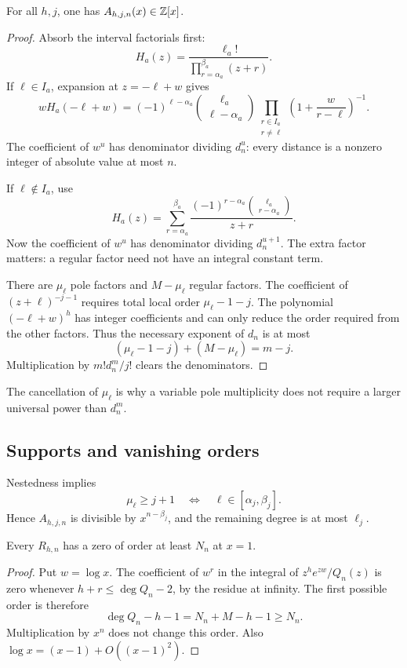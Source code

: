 \begin{lemma}[Integrality]\label{lem:integrality}
For all \(h,j\), one has \(A_{h,j,n}(x)\in\mathbb Z[x]\).
\end{lemma}
\begin{proof}
Absorb the interval factorials first:
\[
H_a(z)=\frac{\ell_a!}{\prod_{r=\alpha_a}^{\beta_a}(z+r)}.
\]
If \(\ell\in I_a\), expansion at \(z=-\ell+w\) gives
\begin{equation}\label{eq:polelocal}
wH_a(-\ell+w)=
(-1)^{\ell-\alpha_a}\binom{\ell_a}{\ell-\alpha_a}
\prod_{\substack{r\in I_a\\r\ne\ell}}
\left(1+\frac{w}{r-\ell}\right)^{-1}.
\end{equation}
The coefficient of \(w^u\) has denominator dividing \(d_n^u\):
every distance is a nonzero integer of absolute value at most \(n\).

If \(\ell\notin I_a\), use
\begin{equation}\label{eq:regularpartial}
H_a(z)=\sum_{r=\alpha_a}^{\beta_a}
\frac{(-1)^{r-\alpha_a}\binom{\ell_a}{r-\alpha_a}}{z+r}.
\end{equation}
Now the coefficient of \(w^u\) has denominator dividing \(d_n^{u+1}\).
The extra factor matters: a regular factor need not have an integral
constant term.

There are \(\mu_\ell\) pole factors and \(M-\mu_\ell\) regular factors.
The coefficient of \((z+\ell)^{-j-1}\) requires total local order
\(\mu_\ell-1-j\). The polynomial \((-\ell+w)^h\) has integer
coefficients and can only reduce the order required from the other
factors. Thus the necessary exponent of \(d_n\) is at most
\[
(\mu_\ell-1-j)+(M-\mu_\ell)=m-j.
\]
Multiplication by \(m!d_n^m/j!\) clears the denominators.
\end{proof}

The cancellation of \(\mu_\ell\) is why a variable pole multiplicity
does not require a larger universal power than \(d_n^m\).

\subsection{Supports and vanishing orders}

Nestedness implies
\[
\mu_\ell\ge j+1\quad\Longleftrightarrow\quad
\ell\in[\alpha_j,\beta_j].
\]
Hence \(A_{h,j,n}\) is divisible by \(x^{n-\beta_j}\), and the
remaining degree is at most \(\ell_j\).

\begin{lemma}[Vanishing at \(1\)]\label{lem:vanishing}
Every \(R_{h,n}\) has a zero of order at least \(N_n\) at \(x=1\).
\end{lemma}
\begin{proof}
Put \(w=\log x\). The coefficient of \(w^r\) in the integral of
\(z^h e^{zw}/Q_n(z)\) is zero whenever \(h+r\le\deg Q_n-2\), by the
residue at infinity. The first possible order is therefore
\[
\deg Q_n-h-1=N_n+M-h-1\ge N_n.
\]
Multiplication by \(x^n\) does not change this order.
Also \(\log x=(x-1)+O((x-1)^2)\).
\end{proof}

